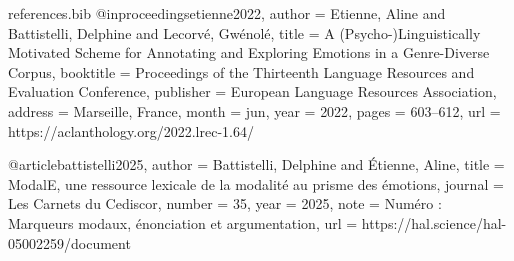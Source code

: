 \begin{filecontents*}{references.bib}
@inproceedings{etienne2022,
  author    = {Etienne, Aline and Battistelli, Delphine and Lecorv{\'e}, Gw{\'e}nol{\'e}},
  title     = {A ({P}sycho-){L}inguistically Motivated Scheme for Annotating and Exploring Emotions in a Genre-Diverse Corpus},
  booktitle = {Proceedings of the Thirteenth Language Resources and Evaluation Conference},
  publisher = {European Language Resources Association},
  address   = {Marseille, France},
  month     = jun,
  year      = {2022},
  pages     = {603--612},
  url       = {https://aclanthology.org/2022.lrec-1.64/}
}

@article{battistelli2025,
  author  = {Battistelli, Delphine and {\'E}tienne, Aline},
  title   = {{ModalE}, une ressource lexicale de la modalit{\'e} au prisme des {\'e}motions},
  journal = {Les Carnets du Cediscor},
  number  = {35},
  year    = {2025},
  note    = {Num{\'e}ro : Marqueurs modaux, {\'e}nonciation et argumentation},
  url     = {https://hal.science/hal-05002259/document}
}
\end{filecontents*}

\documentclass{stageOnera}
%

\usepackage[utf8]{inputenc}
\usepackage[T1]{fontenc}
\usepackage{csquotes}
\usepackage{url}
\usepackage{xcolor}
\usepackage[
  colorlinks=true,
  linkcolor=linkblue,
  citecolor=linkblue,
  urlcolor=linkblue
]{hyperref}
\usepackage[numbers]{natbib}
\usepackage[french]{babel}
\usepackage{booktabs}
\usepackage{placeins}

%











